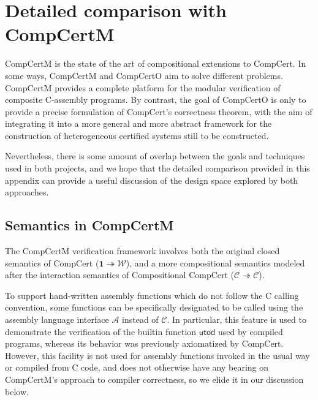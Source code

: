 \documentclass[sigplan,screen,review]{acmart}
\newcommand{\kw}[1]{\ensuremath{ \mathsf{#1} }}
\newcommand{\opt}[2]{#1}
\newenvironment{optional}{}{}
\newcommand{\opt}[2]{#2}
\begin{document}
\opt{}{\balance}



\begin{optional}

\appendix

\section{Detailed comparison with CompCertM} %

CompCertM is the state of the art
of compositional extensions to CompCert.
In some ways,
CompCertM and CompCertO aim to solve different problems.
CompCertM provides a complete platform
for the modular verification of composite C-assembly programs.
By contrast,
the goal of CompCertO is only to
provide a precise formulation of CompCert's correctness theorem,
with the aim of integrating it into
a more general and more abstract framework
for the construction of heterogeneous certified systems
still to be constructed.

Nevertheless,
there is some amount of overlap between
the goals and techniques used in both projects,
and we hope that the detailed comparison
provided in this appendix
can provide a useful discussion
of the design space explored by both approaches.

\subsection{Semantics in CompCertM} %

The CompCertM verification framework involves
both the original closed semantics of CompCert
($\mathbf{1} \twoheadrightarrow \mathcal{W}$),
and a more compositional semantics
modeled after the interaction semantics of Compositional CompCert
($\mathcal{C} \twoheadrightarrow \mathcal{C}$).

To support hand-written assembly functions
which do not follow the C calling convention,
some functions can be specifically designated
to be called
using the assembly language interface $\mathcal{A}$
instead of $\mathcal{C}$.
In particular,
this feature is used to demonstrate
the verification of the builtin function $\kw{utod}$
used by compiled programs,
whereas its behavior was previously
axiomatized by CompCert.
However,
this facility is not used for assembly functions
invoked in the usual way or compiled from C code,
and does not otherwise have any bearing on
CompCertM's approach to compiler correctness,
so we elide it in our discussion below.


\end{optional}
\end{document}
